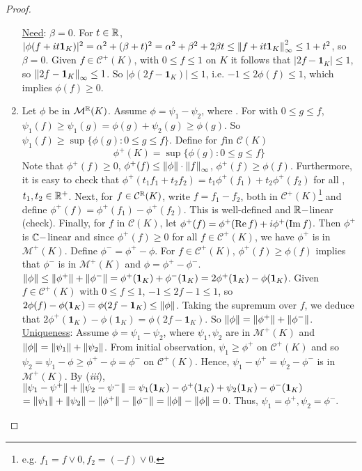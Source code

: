 \documentclass{article}
\begin{document}
\begin{proof}
\begin{enumerate}[label = (\roman*), align = left]
        \noindent\underline{Need}: $\beta=0$. For $t\in\mathbb{R}$, $|\phi(f+it\mathbf{1}_K)|^2=\alpha^2+(\beta+t)^2=\alpha^2+\beta^2+2\beta t\leq \left\lVert f+it\mathbf{1}_K\right\rVert_\infty^2\leq 1+t^2$, so $\beta = 0$. Given $f\in\mathcal{C}^+(K)$, with $0\leq f\leq 1$ on $K$ it follows that $|2f-\mathbf{1}_K|\leq 1$, so $\left\lVert2f-\mathbf{1}_K\right\rVert_\infty\leq 1$. So $|\phi(2f-\mathbf{1}_K)|\leq 1$, i.e. $-1\leq 2\phi(f)\leq 1$, which implies $\phi(f)\geq 0$.
        \item Let $\phi$ be in $\mathcal{M}^{\mathbb{R}}(K)$. Assume $\phi = \psi_1-\psi_2$, where . For  with $0\leq g\leq f$, $\psi_1(f)\geq \psi_1(g)=\phi(g)+\psi_2(g)\geq \phi(g)$. So $\psi_1(f)\geq \sup\{\phi(g):0\leq g \leq f\}$. Define for $f$in $\mathcal{C}(K)$
        $$
        \phi^+(K) = \sup\{\phi(g):0\leq g \leq f\}
        $$
        Note that $\phi^+(f)\geq 0$, $\phi^+(f)\leq \left\lVert\phi\right\rVert\cdot\left\lVert f\right\rVert_\infty$, $\phi^+(f)\geq \phi(f)$. Furthermore, it is easy to check that $\phi^+(t_1 f_1 + t_2 f_2)= t_1\phi^+(f_1) + t_2 \phi^+(f_2)$ for all , $t_1, t_2\in\mathbb{R}^+$. Next, for $f\in\mathcal{C}^{\mathbb{R}}(K)$, write $f=f_1-f_2$, both in $\mathcal{C}^+(K)$\footnote{e.g. $f_1=f\lor 0, f_2 = (-f)\lor 0$.} and define $\phi^+(f)=\phi^+(f_1)-\phi^+(f_2)$. This is well-defined and $\mathbb{R}-$linear (check). Finally, for $f$
        in $\mathcal{C}(K)$, let $\phi^+(f) = \phi^+(\operatorname{Re} f)+i \phi^+(\operatorname{Im} f)$. Then $\phi^+$ is $\mathbb{C}-$linear and since $\phi^+(f)\geq 0 $ for all $f\in\mathcal{C}^+(K)$, we have $\phi^+$ is in $\mathcal{M}^+(K)$. Define $\phi^- = \phi^+-\phi$. For $f\in\mathcal{C}^+(K)$, $\phi^+(f)\geq \phi(f)$ implies that $\phi^-$ is in $\mathcal{M}^+(K)$ and $\phi = \phi^+-\phi^-$. $\left\lVert\phi\right\rVert\leq \left\lVert\phi^+\right\rVert+\left\lVert\phi^-\right\rVert=\phi^+(\mathbf{1}_K)+\phi^-(\mathbf{1}_K)=2\phi^+(\mathbf{1}_K)-\phi(\mathbf{1}_K)$. Given $f\in\mathcal{C}^+(K)$ with $0\leq f \leq 1$, $-1\leq 2f-1\leq 1$, so $2\phi(f)-\phi(\mathbf{1}_K)=\phi(2f-\mathbf{1}_K)\leq \left\lVert\phi\right\rVert$. Taking the supremum over $f$, we deduce that $2\phi^+(\mathbf{1}_K)-\phi(\mathbf{1}_K)=\phi(2f-\mathbf{1}_K)$. So $\left\lVert\phi\right\rVert=\left\lVert\phi^+\right\rVert+\left\lVert\phi^-\right\rVert$.\\

        \noindent\underline{Uniqueness}: Assume $\phi=\psi_1-\psi_2$, where $\psi_1, \psi_2$ are in $\mathcal{M}^+(K)$ and $\left\lVert\phi\right\rVert=\left\lVert\psi_1\right\rVert+\left\lVert\psi_2\right\rVert$. From initial observation, $\psi_1\geq \phi^+$ on $\mathcal{C}^+(K)$ and so $\psi_2=\psi_1-\phi\geq \phi^+-\phi =\phi^-$ on $\mathcal{C}^+(K)$. Hence, $\psi_1-\psi^+=\psi_2-\phi^-$ is in $\mathcal{M}^+(K)$. By (\textit{iii}), $\left\lVert\psi_1-\psi^+\right\rVert+\left\lVert\psi_2-\psi^-\right\rVert=\psi_1(\mathbf{1}_K)-\phi^+(\mathbf{1}_K)+\psi_2(\mathbf{1}_K)-\phi^-(\mathbf{1}_K)$
        $=\left\lVert\psi_1\right\rVert+\left\lVert\psi_2\right\rVert-\left\lVert\phi^+\right\rVert-\left\lVert\phi^-\right\rVert=\left\lVert\phi\right\rVert-\left\lVert\phi\right\rVert=0$. Thus, $\psi_1 = \phi^+, \psi_2=\phi^-$.
 \end{enumerate}
\end{proof}
\end{document}
